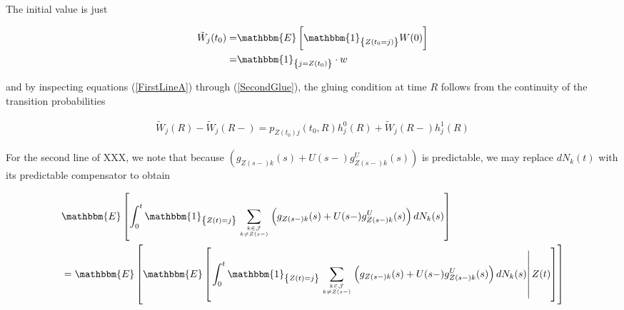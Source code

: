 \documentclass{book}
\newcommand{\1}[1]{\mathbbm{1}_{\left\lbrace #1 \right\rbrace}}
\newcommand{\expec}[1][def]{\mathbbm{E} \left[ #1 \right]}
\newcommand{\econd}[2][def]{\mathbbm{E} \left[ \left. #1 \right| #2 \right]}
\theoremstyle{break}
\theoremstyle{remark}
\numberwithin{equation}{section}
\begin{document}
The initial value is just

\begin{align*}
	\tilde{W}_j(t_0) =& \expec[\1{Z(t_0=j)} W(0)] \\
	=& \1{j=Z(t_0)} \cdot w
\end{align*}

and by inspecting equations (\ref{FirstLineA}) through (\ref{SecondGlue}), the gluing condition at time $R$ follows from the continuity of the transition probabilities

\begin{align*}
	\tilde{W}_j(R) - \tilde{W}_j(R-) = p_{Z(t_0)j}(t_0,R) h_j^0(R) + \tilde{W}_j(R-) h_j^1(R)
\end{align*}

For the second line of XXX, we note that because $\left( g_{Z(s-)k}(s) + U(s-) g_{Z(s-)k}^U(s) \right)$ is predictable, we may replace $dN_k(t)$ with its predictable compensator to obtain

\begin{align*}
    &\expec[\int_0^t \1{Z(t)=j} \sum_{k \in \mathcal{J} \atop k \neq Z(s-)} \left( g_{Z(s-)k}(s) + U(s-) g_{Z(s-)k}^U(s) \right) dN_{k}(s)] \\
    &= \mathbbm{E}\left[ \econd[ \int_0^t \1{Z(t)=j} \sum_{k \in \mathcal{J} \atop k \neq Z(s-)} \left( g_{Z(s-)k}(s) + U(s-) g_{Z(s-)k}^U(s) \right) dN_{k}(s)]{Z(t)} \right]
\end{align*}
\end{document}
